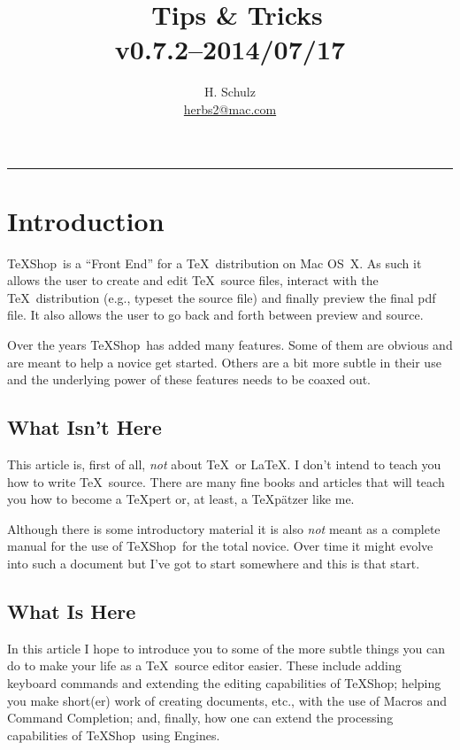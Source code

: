 \documentclass[letterpaper,11pt]{article}
\title{\TS\ Tips \& Tricks\\\small v0.7.2--2014/07/17}
\author{H. Schulz\\\small\href{mailto:herbs2@mac.com}{herbs2@mac.com}}
\date{}
\newcommand{\TS}{\textsf{\TeX Shop}}
\newcommand{\acr}[1]{\textsf{#1}}
\newcommand{\cmd}[1]{\textsf{#1}}
\begin{document}
\maketitle
\tableofcontents

\begin{center}
\rule{0.5\textwidth}{1pt}
\end{center}

\section{Introduction}

\TS\ is a ``Front End'' for a \TeX\ distribution on \cmd{Mac OS~X}. As such it allows the user to create and edit \TeX\ source files, interact with the \TeX\ distribution (e.g., typeset the source file) and finally preview the final \acr{pdf} file. It also allows the user to go back and forth between preview and source.

Over the years \TS\ has added many features. Some of them are obvious and are meant to help a novice get started. Others are a bit more subtle in their use and the underlying power of these features needs to be coaxed out.

\subsection{What Isn't Here}

This article is, first of all, \emph{not} about \TeX\ or \LaTeX. I don't intend to teach you how to write \TeX\ source. There are many fine books and articles that will teach you how to become a \TeX pert or, at least, a \TeX pätzer like me.

Although there is some introductory material it is also \emph{not} meant as a complete manual for the use of \TS\ for the total novice. Over time it might evolve into such a document but I've got to start somewhere and this is that start.

\subsection{What Is Here}

In this article I hope to introduce you to some of the more subtle things you can do to make your life as a \TeX\ source editor easier. These include adding keyboard commands and extending the editing capabilities of \TS; helping you make short(er) work of creating documents, etc., with the use of Macros and Command Completion; and, finally, how one can extend the processing capabilities of \TS\ using Engines.
\end{document}
